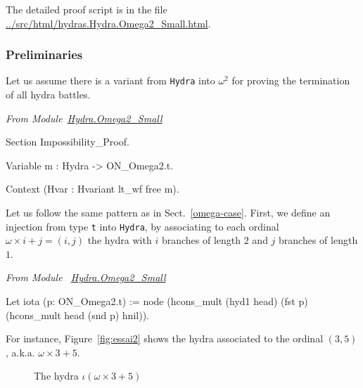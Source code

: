 \documentclass[a4paper]{book}
\begin{document}
The detailed  proof script is in the file \url{../src/html/hydras.Hydra.Omega2_Small.html}.

\subsubsection{Preliminaries}
Let us assume there is a variant from \texttt{Hydra} into $\omega^2$  for proving the   termination of all hydra battles.

\vspace{4pt}
\emph{From Module~\href{../src/html/hydras.Hydra.Omega2_Small.html}{Hydra.Omega2\_Small}}


\begin{Coqsrc}
  Section Impossibility_Proof.
  
 Variable m : Hydra -> ON_Omega2.t.
  
 Context (Hvar : Hvariant lt_wf free m).
\end{Coqsrc}


Let us follow the same pattern as in Sect.~\ref{omega-case}.
First, we define an injection from type \texttt{t} into \texttt{Hydra}, by
 associating to  each ordinal $\omega\times i+ j = (i,j)$ the hydra with $i$ branches of length $2$ and
$j$ branches of length $1$.


\vspace{4pt}
\emph{From Module ~\href{../src/html/hydras.Hydra.Omega2_Small.html\#iota}{Hydra.Omega2\_Small}}

\begin{Coqsrc}
Let iota (p: ON_Omega2.t) := 
    node (hcons_mult (hyd1 head) (fst p)
                     (hcons_mult head (snd p) hnil)).
  \end{Coqsrc}

For instance, Figure~\vref{fig:essai2} shows the hydra associated to the ordinal 
$(3,5)$, a.k.a. $\omega\times 3 + 5$.

\begin{figure}[htb]
\centering
{}
\caption{\label{fig:essai2}
The hydra $\iota(\omega\times 3+5)$}
\end{figure}
\end{document}
